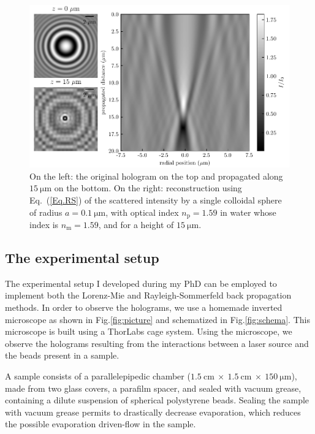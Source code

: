 \begin{figure}[!ht]
	\centering
	\includegraphics{02_body/chapter2/images/Back-propagation/backpropagation.pdf}
	\caption{On the left: the original hologram on the top and propagated along $15 ~ \mathrm{\mu m}$ on the bottom. On the right: reconstruction using Eq.~(\ref{Eq.RS}) of the scattered intensity by a single colloidal sphere of radius $a = 0.1 ~ \mathrm{\mu m}$, with optical index $n_\mathrm{p} = 1.59$ in water whose index is $n_\mathrm{m} = 1.59$, and for a height of $15 ~ \mathrm{\mu m}$.~\href{https://github.com/eXpensia/Confined-Brownian-Motion/blob/main/02_body/chapter2/images/Back-propagation/Back-propagation.ipynb}{\faGithub}}
	\label{fig.sommerfeld}
\end{figure}



\subsection{The experimental setup}
\label{chap:exp-setup}

The experimental setup I developed during my PhD can be employed to implement both the Lorenz-Mie and Rayleigh-Sommerfeld back propagation methods. In order to observe the holograms, we use a homemade inverted microscope as shown in Fig.\ref{fig:picture} and schematized in Fig.\ref{fig:schema}. This microscope is built using a ThorLabs cage system. Using the microscope, we observe the holograms resulting from the interactions between a laser source and the beads present in a sample.

A sample consists of a parallelepipedic chamber ($1.5 ~ \text{cm} ~ \times ~ 1.5 ~ \text{cm} ~ \times ~ 150 ~ \mathrm{\mu m} $), made from two glass covers, a parafilm spacer, and sealed with vacuum grease, containing a dilute suspension of spherical polystyrene beads. Sealing the sample with vacuum grease permits to drastically decrease evaporation, which reduces the possible evaporation driven-flow in the sample.

